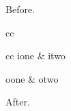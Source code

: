 \documentclass[apj]{emulateapj}
\begin{document}
Before.
\begin{deluxetable}{cc}
\begin{deluxetable}{cc}
\startdata
ione & itwo \\
\enddata
\end{deluxetable}
\startdata
oone & otwo \\
\enddata
\label{sec:interpdisk}
\end{deluxetable}
After.
\end{document}
